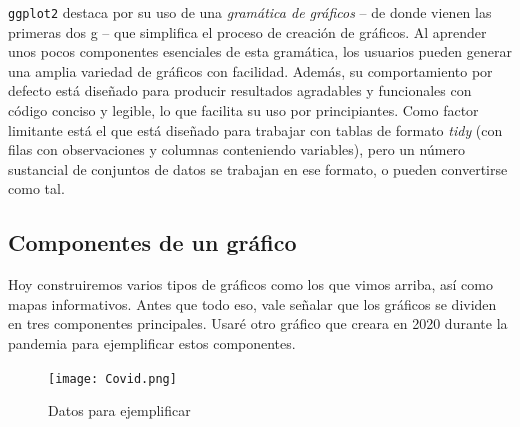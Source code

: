 \documentclass[
]{article}
\begin{document}
\texttt{ggplot2} destaca por su uso de una \emph{gramática de gráficos}
-- de donde vienen las primeras dos g -- que simplifica el proceso de
creación de gráficos. Al aprender unos pocos componentes esenciales de
esta gramática, los usuarios pueden generar una amplia variedad de
gráficos con facilidad. Además, su comportamiento por defecto está
diseñado para producir resultados agradables y funcionales con código
conciso y legible, lo que facilita su uso por principiantes. Como factor
limitante está el que está diseñado para trabajar con tablas de formato
\emph{tidy} (con filas con observaciones y columnas conteniendo
variables), pero un número sustancial de conjuntos de datos se trabajan
en ese formato, o pueden convertirse como tal.

\subsection{Componentes de un
gráfico}\label{componentes-de-un-gruxe1fico}

Hoy construiremos varios tipos de gráficos como los que vimos arriba,
así como mapas informativos. Antes que todo eso, vale señalar que los
gráficos se dividen en tres componentes principales. Usaré otro gráfico
que creara en 2020 durante la pandemia para ejemplificar estos
componentes.

\begin{figure}
\centering
\texttt{[image: Covid.png]}
\caption{Datos para ejemplificar}
\end{figure}
\end{document}
